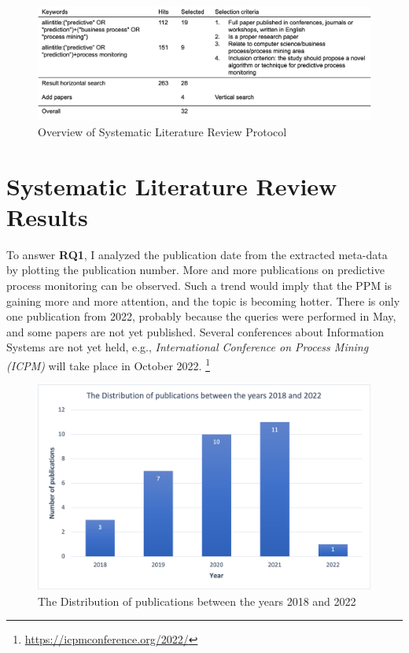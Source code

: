 \documentclass[runningheads]{llncs}
\begin{document}
		\begin{figure}
		\includegraphics[width=\textwidth]{Filtering.png}
		\caption{Overview of Systematic Literature Review Protocol} 
		\label{Filtering}
		\end{figure}
		
		
		
	\section{Systematic Literature Review Results}
		
		To answer \textbf{RQ1}, I analyzed the publication date from the extracted meta-data by plotting the publication number. More and more publications on predictive process monitoring can be observed. Such a trend would imply that the PPM is gaining more and more attention, and the topic is becoming hotter. There is only one publication from 2022, probably because the queries were performed in May, and some papers are not yet published. Several conferences about Information Systems are not yet held, e.g., \textit{International Conference on Process Mining (ICPM)} will take place in October 2022. \footnote{\url{https://icpmconference.org/2022/}} 
		
	
		\begin{figure}
		\includegraphics[scale=0.35]{Distribution_publications.png}
		\centering
		\caption{The Distribution of publications between the years 2018 and 2022}
		\end{figure}
		
\end{document}
